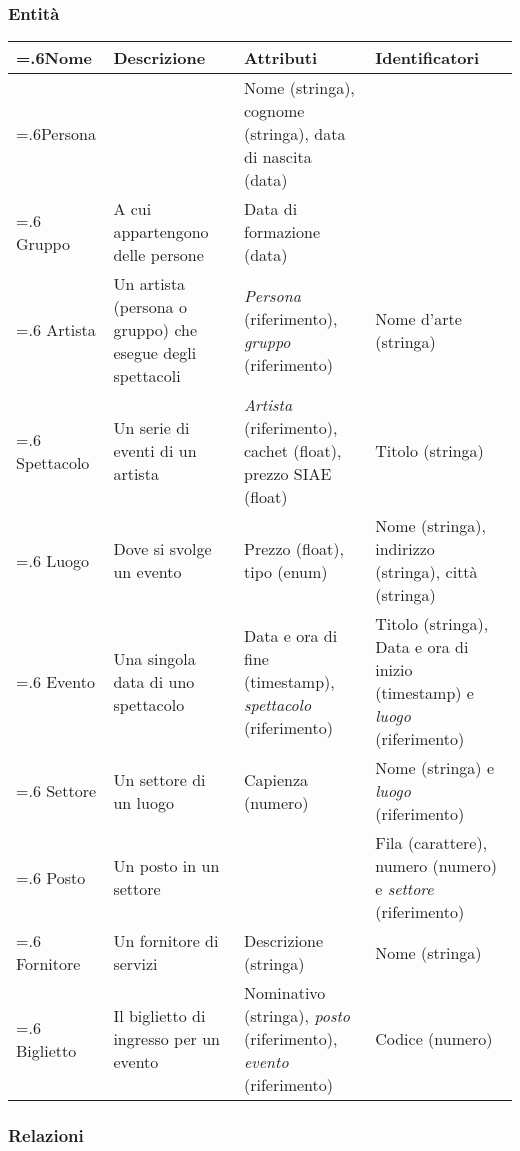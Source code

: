 \documentclass[a4paper,11pt]{article}
\begin{document}
\subsubsection*{Entità}

\begin{tabularx}{\textwidth}{|>{\hsize=.6\hsize}X|>{\raggedright\arraybackslash}X|>{\raggedright\arraybackslash\hsize=1.4\hsize}X|>{\raggedright\arraybackslash}X|}
\hline
\textbf{Nome} & \textbf{Descrizione} & \textbf{Attributi} & \textbf{Identificatori}\\
\hline
Persona & & Nome (stringa), cognome (stringa), data di nascita (data) &\\
\hline
Gruppo & A cui appartengono delle persone & Data di formazione (data) &\\
\hline
Artista & Un artista (persona o gruppo) che esegue degli spettacoli & \textit{Persona} (riferimento), \textit{gruppo} (riferimento) & Nome d'arte (stringa)\\
\hline
Spettacolo & Un serie di eventi di un artista & \textit{Artista} (riferimento), cachet (float), prezzo SIAE (float) & Titolo (stringa)\\
\hline
Luogo & Dove si svolge un evento & Prezzo (float), tipo (enum) & Nome (stringa), indirizzo (stringa), città (stringa)\\
\hline
Evento & Una singola data di uno spettacolo & Data e ora di fine (timestamp), \textit{spettacolo} (riferimento) & Titolo (stringa), Data e ora di inizio (timestamp) e \textit{luogo} (riferimento)\\
\hline
Settore & Un settore di un luogo & Capienza (numero) & Nome (stringa) e \textit{luogo} (riferimento)\\
\hline
Posto & Un posto in un settore & & Fila (carattere), numero (numero) e \textit{settore} (riferimento)\\
\hline
Fornitore & Un fornitore di servizi & Descrizione (stringa) & Nome (stringa)\\
\hline
Biglietto & Il biglietto di ingresso per un evento & Nominativo (stringa), \textit{posto} (riferimento), \textit{evento} (riferimento) & Codice (numero)\\
\hline
\end{tabularx}

\subsubsection*{Relazioni}
\end{document}
